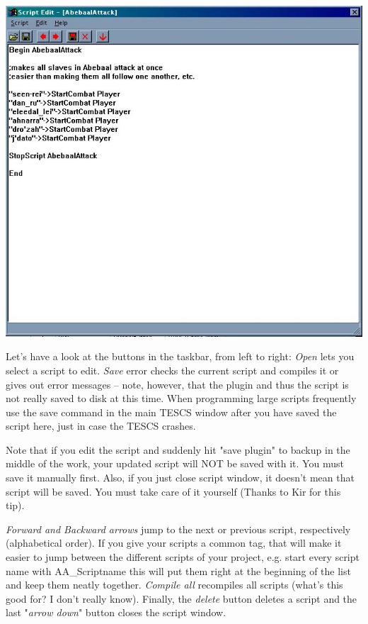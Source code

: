 \documentclass[
]{article}
\begin{document}
\includegraphics{media/image2.jpg}

Let's have a look at the buttons in the taskbar, from left to right:
\emph{Open} lets you select a script to edit. \emph{Save} error checks
the current script and compiles it or gives out error messages -- note,
however, that the plugin and thus the script is not really saved to disk
at this time. When programming large scripts frequently use the save
command in the main TESCS window after you have saved the script here,
just in case the TESCS crashes.

Note that if you edit the script and suddenly hit "save plugin" to
backup in the middle of the work, your updated script will NOT be saved
with it. You must save it manually first. Also, if you just close script
window, it doesn't mean that script will be saved. You must take care of
it yourself (Thanks to Kir for this tip).

\emph{Forward and Backward arrows} jump to the next or previous script,
respectively (alphabetical order). If you give your scripts a common
tag, that will make it easier to jump between the different scripts of
your project, e.g. start every script name with AA\_Scriptname this will
put them right at the beginning of the list and keep them neatly
together. \emph{Compile all} recompiles all scripts (what's this good
for? I don't really know). Finally, the \emph{delete} button deletes a
script and the last "\emph{arrow down}" button closes the script window.
\end{document}
